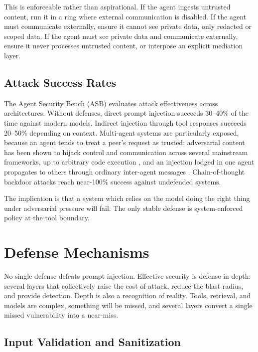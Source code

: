 \documentclass[11pt]{book}
\begin{document}
This is enforceable rather than aspirational. If the agent ingests untrusted content, run it in a ring where external communication is disabled. If the agent must communicate externally, ensure it cannot see private data, only redacted or scoped data. If the agent must see private data and communicate externally, ensure it never processes untrusted content, or interpose an explicit mediation layer.

\subsection{Attack Success Rates}

The Agent Security Bench (ASB) \cite{asb2025} evaluates attack effectiveness across architectures. Without defenses, direct prompt injection succeeds 30--40\% of the time against modern models. Indirect injection through tool responses succeeds 20--50\% depending on context. Multi-agent systems are particularly exposed, because an agent tends to treat a peer's request as trusted; adversarial content has been shown to hijack control and communication across several mainstream frameworks, up to arbitrary code execution \cite{maliciouscode2025}, and an injection lodged in one agent propagates to others through ordinary inter-agent messages \cite{promptinfection2024}. Chain-of-thought backdoor attacks reach near-100\% success against undefended systems.

The implication is that a system which relies on the model doing the right thing under adversarial pressure will fail. The only stable defense is system-enforced policy at the tool boundary.

\section{Defense Mechanisms}

No single defense defeats prompt injection. Effective security is defense in depth: several layers that collectively raise the cost of attack, reduce the blast radius, and provide detection. Depth is also a recognition of reality. Tools, retrieval, and models are complex, something will be missed, and several layers convert a single missed vulnerability into a near-miss.

\subsection{Input Validation and Sanitization}
\end{document}
